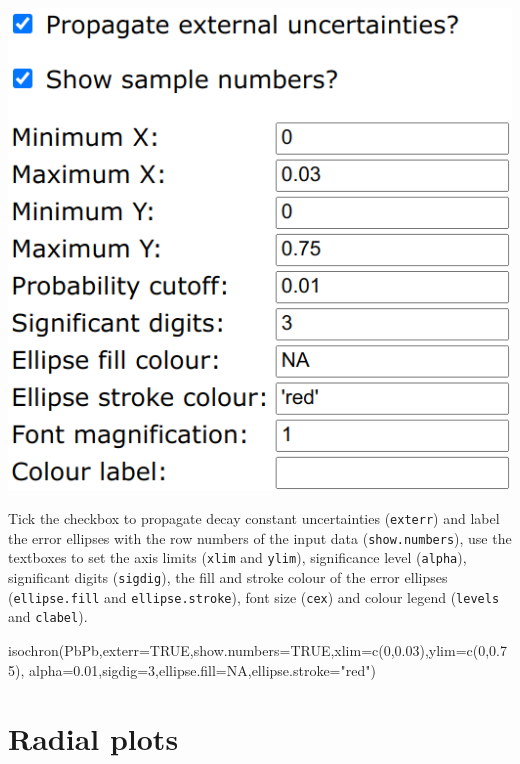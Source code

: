 \begin{refsection}
\begin{enumerate}
\noindent\begin{minipage}[t]{.4\linewidth}
\strut\vspace*{-\baselineskip}\newline
\includegraphics[width=\linewidth]{../figures/PbPbIsochronOtherOptions.png}
\end{minipage}
\begin{minipage}[t]{.6\linewidth}
  Tick the checkbox to propagate decay constant uncertainties
  (\texttt{exterr}) and label the error ellipses with the row numbers
  of the input data (\texttt{show.numbers}), use the textboxes to set
  the axis limits (\texttt{xlim} and \texttt{ylim}), significance
  level (\texttt{alpha}), significant digits (\texttt{sigdig}), the
  fill and stroke colour of the error ellipses (\texttt{ellipse.fill}
  and \texttt{ellipse.stroke}), font size (\texttt{cex}) and colour
  legend (\texttt{levels} and \texttt{clabel}).  
\end{minipage}

\begin{script}
isochron(PbPb,exterr=TRUE,show.numbers=TRUE,xlim=c(0,0.03),ylim=c(0,0.75),
         alpha=0.01,sigdig=3,ellipse.fill=NA,ellipse.stroke="red")
\end{script}
  
\end{enumerate}

\section{Radial plots}\label{sec:PbPbRadial}


\end{refsection}
